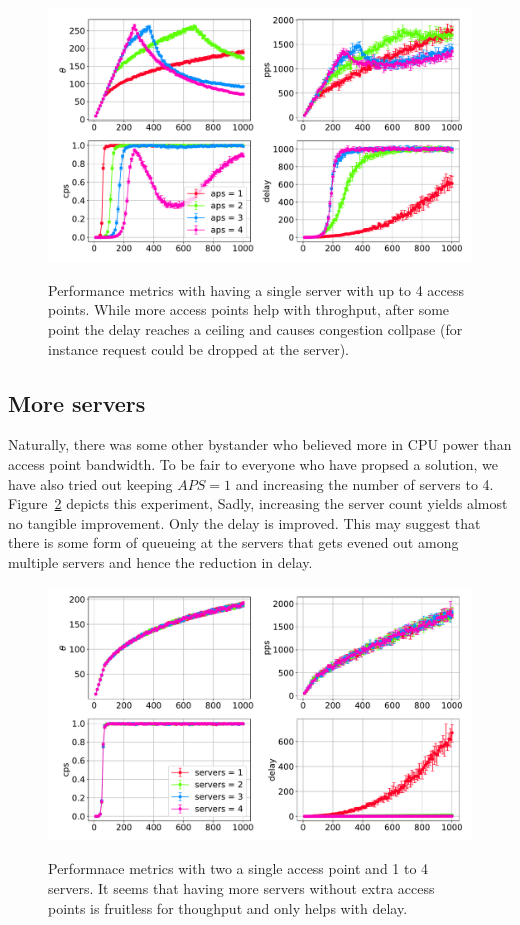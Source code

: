 \documentclass{report}
\begin{document}
\begin{figure}[h]
    \includegraphics[width=\linewidth]{../data/part_three.pdf}
    \label{fig:part_three}
    \caption{Performance metrics with having a single server with 
    up to 4 access points. While more access points help with throghput, 
    after some point the delay reaches a ceiling and causes congestion collpase
    (for instance request could be dropped at the server).}
\end{figure}

\subsection{More servers}

Naturally, there was some other bystander who believed more in CPU power than
access point bandwidth. To be fair to everyone who have propsed a solution, 
we have also tried out keeping $APS=1$ and increasing the number of servers
to 4. Figure~\ref{fig:part_four} depicts this experiment, Sadly, increasing the
server count yields almost no tangible improvement. Only the delay is 
improved. This may suggest that there is some form of queueing at the servers
that gets evened out among multiple servers and hence the reduction in delay.

\begin{figure}[h]
    \includegraphics[width=\linewidth]{../data/part_four.pdf}
    \label{fig:part_four}
    \caption{Performnace metrics with two a single access point and
    1 to 4 servers. It seems that having more servers without extra access
    points is fruitless for thoughput and only helps with delay.}
\end{figure}
\end{document}
